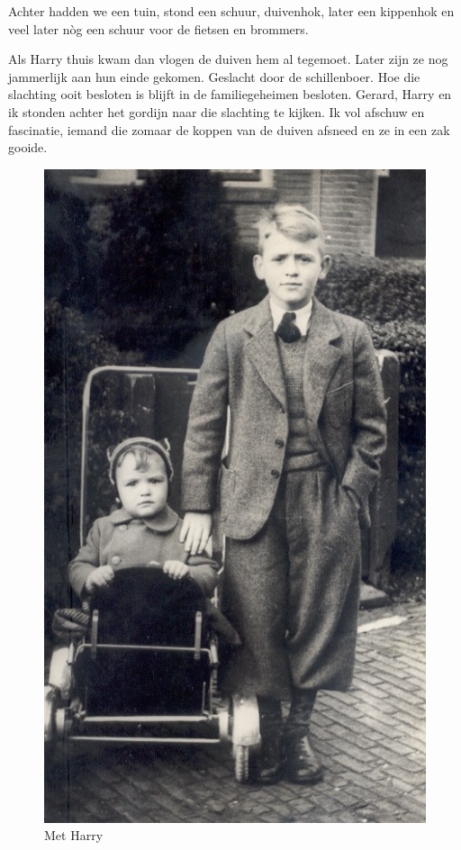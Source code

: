 \documentclass[12pt,twoside, openright]{memoir}
\begin{document}
Achter hadden we een tuin, stond een schuur, duivenhok, later een kippenhok en veel later nòg een schuur voor de fietsen en brommers. 

Als Harry thuis kwam dan vlogen de duiven hem al tegemoet. Later zijn ze nog jammerlijk aan hun einde gekomen. Geslacht door de schillenboer. Hoe die slachting ooit besloten is blijft in de familiegeheimen besloten. Gerard, Harry en ik stonden achter het gordijn naar die slachting te kijken. Ik vol afschuw en fascinatie, iemand die zomaar de koppen van de duiven afsneed en ze in een zak gooide.

\begin{figure}
\includegraphics[width=\textwidth]{img/ch5/RuudHarry2}
\caption*{\footnotesize Met Harry}
\end{figure}
\end{document}
